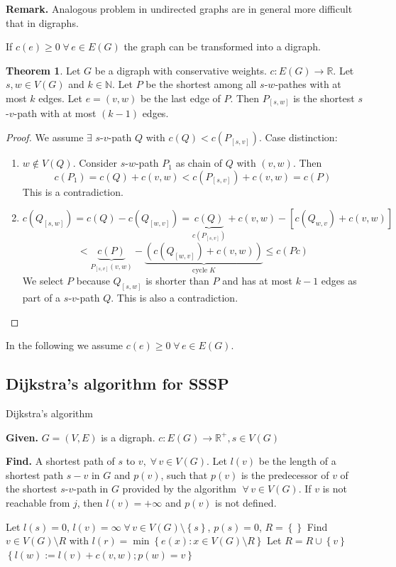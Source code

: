 \documentclass[a4paper]{article}
\theoremstyle{definition}
\newtheorem{theorem}{Theorem}
\newcommand{\set}[1]{\left\{#1\right\}}
\newcommand{\given}[1]{\textbf{Given.} #1\par}
\newcommand{\find}[1]{\textbf{Find.} #1\par}
\newcommand{\gath}[2]{$#1$-$#2$-path} %
\newcommand{\fall}{\;\forall\,}
\begin{document}
\textbf{Remark.}
  Analogous problem in undirected graphs are in general more difficult that in digraphs.

If $c(e) \geq 0 \fall e \in E(G)$ the graph can be transformed into a digraph.

\begin{theorem}\label{proposition-3.1}
Let $G$ be a digraph with conservative weights. $c: E(G) \rightarrow \mathbb{R}$. Let $s, w \in V(G)$ and $k \in \mathbb{N}$. Let $P$ be the shortest among all \gath swes with at most $k$ edges. Let $e = (v, w)$ be the last edge of $P$. Then $P_{[s, w]}$ is the shortest \gath sv with at most $(k-1)$ edges.
\end{theorem}

\begin{proof}
We assume $\exists$ \gath sv $Q$ with $c(Q) < c(P_{[s,v]})$. Case distinction:
\begin{enumerate}
  \item $w \notin V(Q)$. Consider \gath sw $P_1$ as chain of $Q$ with $(v, w)$. Then
    \[
      c(P_1) = c(Q) + c(v, w) < c(P_{[s,v]}) + c(v,w) = c(P)
    \]
    This is a contradiction.
  \item
    \[
      c(Q_{[s,w]}) = c(Q) - c(Q_{[w,v]})
        = \underbrace{c(Q)}_{c(P_{[s,v]})} + c(v,w) - [c(Q_{w,v}) + c(v,w)]
    \] \[
        < \underbrace{c(P)}_{P_{[s,v]}(v,w)}
          - \underbrace{\left(c(Q_{[w,v]}) + c(v,w)\right)}_{\text{cycle }K}
        \leq c(Pc)
    \]
    We select $P$ because $Q_{[s,w]}$ is shorter than $P$ and has at most $k-1$ edges as part of a \gath sv $Q$. This is also a contradiction.
\end{enumerate}
\end{proof}

In the following we assume $c(e) \geq 0 \fall e \in E(G)$.

\subsection{Dijkstra's algorithm for SSSP}
%
\begin{algorithm}
  \caption{Dijkstra's algorithm}
  \label{dijkstras-algo}
  \given{$G = (V, E)$ is a digraph. $c: E(G) \rightarrow \mathbb{R}^+, s \in V(G)$}
  \find{A shortest path of $s$ to $v, \fall v \in V(G)$. Let $l(v)$ be the length of a shortest path $s-v$ in $G$ and $p(v)$, such that $p(v)$ is the predecessor of $v$ of the shortest \gath sv in $G$ provided by the algorithm $\fall v \in V(G)$. If $v$ is not reachable from $j$, then $l(v) = +\infty$ and $p(v)$ is not defined.}
\begin{algorithmic}[1]
  \State Let $l(s) = 0$, $l(v) = \infty \fall v \in V(G) \setminus \set{s}$, $p(s) = 0$, $R = \set{}$
  \State Find $v \in V(G) \setminus R$ with $l(r) = \min\set{e(x) : x \in V(G) \setminus R}$ \label{dijkstra-redo}
  \State Let $R = R \cup \set{v}$
      \State $\set{l(w) := l(v) + c(v, w); p(w) = v}$
    \EndIf
  \EndFor
  \EndIf
\end{algorithmic}
\end{algorithm}
\end{document}
